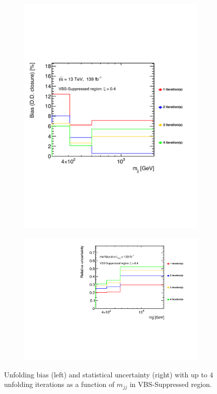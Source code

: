 \begin{figure}[htb]
    \centering
    \begin{subfigure}{.49\textwidth}
        \centering
        \includegraphics[width=.92\linewidth]{figures/Analysis/Unfolding/UnfoldingBiasIteration.pdf}
    \end{subfigure}
    \begin{subfigure}{.49\textwidth}
        \centering
        \includegraphics[width=.95\linewidth]{figures/Analysis/Unfolding/StatUnc_Sup.pdf}
    \end{subfigure}
    \caption{ Unfolding bias (left) and statistical uncertainty (right) with up to $4$ unfolding iterations as a function of $m_{jj}$ in VBS-Suppressed region. \label{fig:BiasStatUnc}}
\end{figure}

